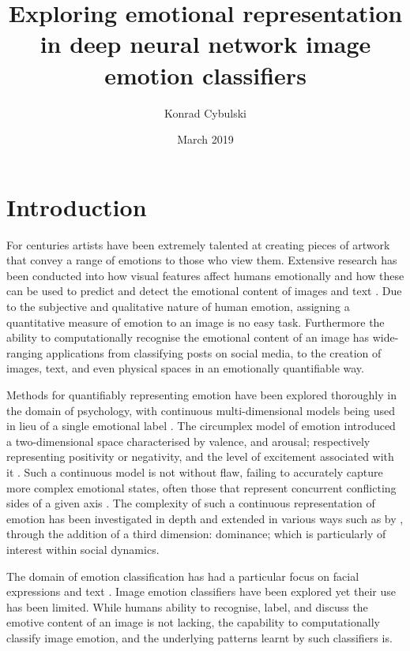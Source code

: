 \documentclass{article}
\title{Exploring emotional representation in deep neural network image emotion classifiers}
\author{Konrad Cybulski}
\date{March 2019}
\begin{document}
	
\maketitle


\section{Introduction}

For centuries artists have been extremely talented at creating pieces of artwork that convey a range of emotions to those who view them.
Extensive research has been conducted into how visual features affect humans emotionally and how these can be used to predict and detect the emotional content of images and text \citep{machajdik2010affective, zhao2014exploring}.
Due to the subjective and qualitative nature of human emotion, assigning a quantitative measure of emotion to an image is no easy task.
Furthermore the ability to computationally recognise the emotional content of an image has wide-ranging applications from classifying posts on social media, to the creation of images, text, and even physical spaces in an emotionally quantifiable way.

Methods for quantifiably representing emotion have been explored thoroughly in the domain of psychology, with continuous multi-dimensional models being used in lieu of a single emotional label .
The circumplex model of emotion introduced a two-dimensional space characterised by valence, and arousal; respectively representing positivity or negativity, and the level of excitement associated with it \citep{russell1980circumplex}.
Such a continuous model is not without flaw, failing to accurately capture more complex emotional states, often those that represent concurrent conflicting sides of a given axis \citep{larsen1992promises}.
The complexity of such a continuous representation of emotion has been investigated in depth and extended in various ways such as by \citet{bradley1994measuring}, through the addition of a third dimension: dominance; which is particularly of interest within social dynamics.

The domain of emotion classification has had a particular focus on facial expressions and text \citep{cambria2016affective, warriner2013norms}.
Image emotion classifiers have been explored \citep{kim2018building, machajdik2010affective, chen2015learning, chen2014deepsentibank} yet their use has been limited.
While humans ability to recognise, label, and discuss the emotive content of an image is not lacking, the capability to computationally classify image emotion, and the underlying patterns learnt by such classifiers is.
\end{document}

